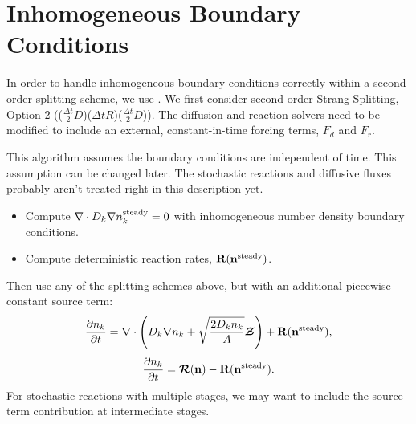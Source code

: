 \documentclass[final]{siamltex}
\newcommand{\nb}{\mathbf{n}}
\def\Rb  {{\bf R}}
\def\mRb {\bm{\mathcal{R}}}
\def\mZb {\bm{\mathcal{Z}}}
\begin{document}
\section{Inhomogeneous Boundary Conditions}
In order to handle inhomogeneous boundary conditions correctly within a second-order
splitting scheme, we use \cite{Einkemmer:2014}.  We first consider second-order
Strang Splitting, Option 2 (($\frac{\Delta t}{2}D$)($\Delta t R$)($\frac{\Delta t}{2}D$)).
The diffusion and reaction solvers need to be modified to include an external, 
constant-in-time forcing terms, $F_d$ and $F_r$.

This algorithm assumes the boundary conditions are independent of time.  This
assumption can be changed later.  The stochastic reactions and diffusive fluxes
probably aren't treated right in this description yet.

\begin{itemize}
\item Compute $\nabla\cdot D_k\nabla n_k^{\rm steady} = 0$ with inhomogeneous number density boundary
conditions.

\item Compute deterministic reaction rates, $\Rb(\nb^{\rm steady})$.
\end{itemize}

Then use any of the splitting schemes above, but with an additional piecewise-constant
source term:
\begin{equation}
\frac{\partial n_k}{\partial t} = \nabla\cdot\left(D_k\nabla n_k + \sqrt{\frac{2D_kn_k}{A}}\mZb\right) + \Rb(\nb^{\rm steady}),\label{eq:Diffusion_bc}
\end{equation}
\begin{equation}
\frac{\partial n_k}{\partial t} = \mRb(\nb) - \Rb(\nb^{\rm steady}).\label{eq:Reactions_bc}
\end{equation}
For stochastic reactions with multiple stages, we may want to include the source 
term contribution at intermediate stages.



\end{document}
